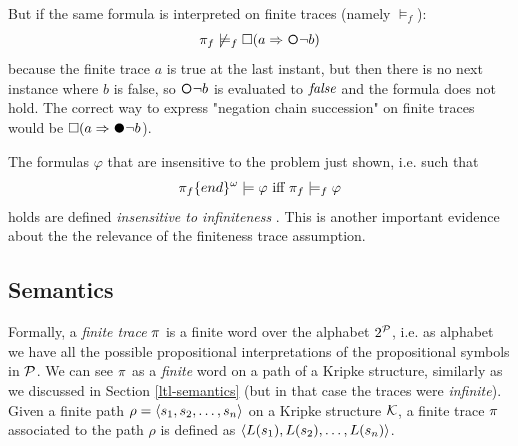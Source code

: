 \begin{example}
	But if the same formula is interpreted on finite traces (namely $\models_f$):
	\[
	\pi_{f} \not\models_f \Box (a \Rightarrow \Next \lnot b)
	\]
	because the finite trace $a$ is true at the last instant, but then there is no next instance where $b$ is false, so $\Next \lnot b$ is evaluated to $\mathit{false}$ and the formula does not hold.
	The correct way to express "negation chain succession" on finite traces would be $\Box (a \Rightarrow \Wnext \lnot b$).
	
	The \LTL formulas $\varphi$ that are insensitive to the problem just shown, i.e. such that
	\begin{equation}
	\pi_f\{end\}^\omega \models \varphi \ \text{iff}\  \pi_{f}\models_f \varphi
	\end{equation}
	holds are defined \emph{insensitive to infiniteness} \citep{DeGiacomo:2014:RLF:2893873.2894033}. This is another important evidence about the the relevance of the finiteness trace assumption.
	
\end{example}

\subsection{Semantics}\label{ltlf-semantics}
Formally, a \emph{finite trace} $\pi$ is a finite word over the alphabet $2^{\mathcal{P}}$, i.e. as alphabet we have all the possible propositional interpretations of the propositional symbols in $\mathcal{P}$. We can see $\pi$ as a \emph{finite} word on a path of a Kripke structure, similarly as we discussed in Section \ref{ltl-semantics} (but in that case the traces were \emph{infinite}). Given a finite path $\rho = \langle s_1, s_2, \dots, s_n \rangle$ on a Kripke structure $\mathcal{K}$, a finite trace $\pi$ associated to the path $\rho$ is defined as $\langle L(s_1), L(s_2),\dots, L(s_n) \rangle$.


